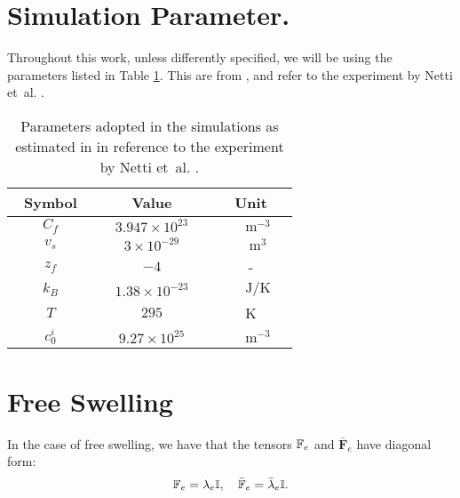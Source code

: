 \section{Simulation Parameter.}
\label{para}
Throughout this work, unless differently specified, we will be using the parameters listed in Table \ref{Tab1}. This are from \cite{ecm2}, and refer to the experiment by Netti et~al. \cite{Netti,ecm2}.
\begin{table}[h!]
	\vspace{4mm}
	\centering
	\begin{tabular}{|c| c| c|}
		\hline\addlinespace[2pt]
		Symbol  & Value& Unit\\
		\hline\addlinespace[3pt]
		$\qquad C_f\qquad$  & $\quad3.947\times 10^{23}\quad$& $\qquad\text{m}^{-3}\quad$\\
		$\qquad v_s\qquad$  & $\quad3\times 10^{-29}\quad$& $\qquad\text{m}^3\quad$ \\
		$\qquad z_f\qquad$ & $-4$& -\\
		$\qquad k_B\qquad$ & $1.38 \times 10^{-23}$& $\qquad\text{J}/\text{K}\quad$\\
		$\qquad T\qquad$ &$295$ &K\\
		$\qquad c^i_0\qquad$ & $9.27\times 10^{25}$& $\qquad\text{m}^{-3}\quad$\\
		\hline
	\end{tabular}
	\vspace{4mm}
	\caption{Parameters adopted in the simulations as estimated in \cite{ecm2} in reference to the experiment by Netti et~al. \cite{Netti}.}
	\label{Tab1}
\end{table}

\section{Free Swelling}
\label{apfree}
In the case of free swelling, we have that the tensors $\mathbb{F}_e$ and $\mathbf{\bar{F}}_e$ have diagonal form: 
\begin{equation}
\mathbb{F}_e=\lambda_e \mathbb{I},\quad \bar{\mathbb{F}}_e=\bar{\lambda}_e \mathbb{I}.
\end{equation}

